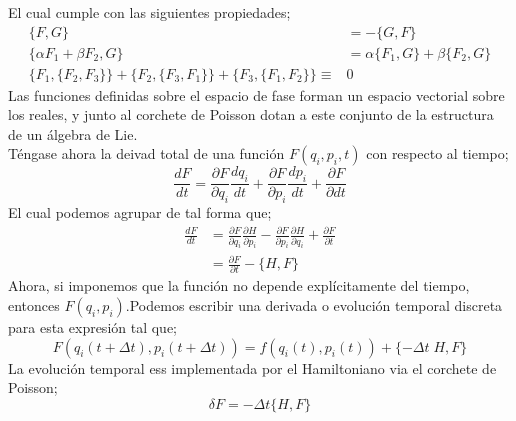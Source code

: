 \documentclass[../main.tex]{subfiles}
\begin{document}
  El cual cumple con las siguientes propiedades;
  \begin{align}
    \{F,G\} & = -\{G,F\} \\
    \{\alpha F_1 + \beta F_2, G\} & = \alpha \{F_1,G\} + \beta \{F_2,G\} \\
    \{F_1,\{F_2,F_3\}\} + \{F_2,\{ F_3,F_1 \} \} + \{F_3 ,\{F_1,F_2\} \} \equiv &  0
  \end{align}
  Las funciones definidas sobre el espacio de fase forman un espacio vectorial sobre los reales, y junto al corchete de Poisson dotan a este conjunto de la estructura de un álgebra de Lie.
\\
Téngase ahora la deivad total de una función $F(q_i,p_i,t)$ con respecto al tiempo;
\begin{equation}
  \frac{dF}{dt} = \frac{\partial F}{\partial q_i}\frac{dq_i}{dt} + \frac{\partial F}{\partial p_i}\frac{d p_i}{dt} + \frac{\partial F}{\partial dt}
 \end{equation}
 El cual podemos agrupar de tal forma que;
 \begin{align*}
   \frac{dF}{dt} & =  \frac{\partial F}{\partial q_i}\frac{\partial H}{\partial p_i} - \frac{\partial F}{\partial p_i} \frac{\partial H}{\partial q_i} + \frac{\partial F}{\partial t} \\
   & = \frac{\partial F}{\partial t} - \{H,F\}
 \end{align*}
 Ahora, si imponemos que la función no depende explícitamente del tiempo, entonces $F(q_i,p_i)$.Podemos escribir una derivada o evolución temporal discreta para esta expresión tal que;
 \begin{equation}
   F(q_i(t+\Delta t), p_i(t+\Delta t))  = f(q_i(t),p_i(t)) + \{-\Delta t\; H,F\}
  \end{equation}
  La evolución temporal ess implementada por el Hamiltoniano via el corchete de Poisson;
\begin{equation}
  \delta F = -\Delta t \{H,F\}
 \end{equation}
\end{document}
